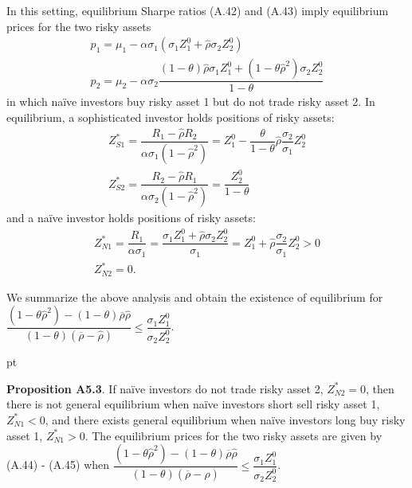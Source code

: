 \documentclass[10pt]{article}
\begin{document}
In this setting, equilibrium Sharpe ratios (A.42) and (A.43) imply equilibrium prices for the two risky assets
\begin{eqnarray}
& p_1 = \mu_1 - \alpha \sigma_1 (\sigma_1 Z_1^0 + {\hat \rho} \sigma_2 Z_2^0) & \\
& p_2 = \mu_2 - \alpha \sigma_2 \dfrac{(1 - \theta) {\hat \rho} \sigma_1 Z_1^0 + (1 - \theta {\hat \rho}^2) \sigma_2 Z_2^0}{1 - \theta} &
\end{eqnarray}
in which na\"ive investors buy risky asset 1 but do not trade risky asset 2. In equilibrium, a sophisticated investor holds positions of risky assets:
\begin{eqnarray}
& Z_{S 1}^* = \dfrac{R_1 - \hat \rho R_2}{\alpha \sigma_1 (1 - \hat \rho^2)} = Z_1^0 - \dfrac{\theta}{1 - \theta} {\hat \rho} \dfrac{\sigma_2}{\sigma_1} Z_2^0 & \\
& Z_{S 2}^* = \dfrac{R_2 - \hat \rho R_1}{\alpha \sigma_2 (1 - \hat \rho^2)} = \dfrac{Z_2^0}{1 - \theta} &
\end{eqnarray}
and a na\"ive investor holds positions of risky assets:
\begin{eqnarray}
& Z_{N 1}^* = \dfrac{R_1}{\alpha \sigma_1} = \dfrac{\sigma_1 Z_1^0 + {\hat \rho} \sigma_2 Z_2^0}{\sigma_1} = Z_1^0 + {\hat \rho} \dfrac{\sigma_2}{\sigma_1} Z_2^0 > 0 & \\
& Z_{N 2}^* = 0. &
\end{eqnarray}

We summarize the above analysis and obtain the existence of equilibrium for $ \dfrac{(1 - \theta {\hat \rho}^2) - (1 - \theta) \overline{\rho} {\hat \rho}}{(1 - \theta) (\overline{\rho} - {\hat \rho})} \leqslant \dfrac{\sigma_1 Z_1^0}{\sigma_2 Z_2^0} $.

 pt

{\bf Proposition A5.3}. If na\"ive investors do not trade risky asset 2, $ Z_{N 2}^* = 0 $, then there is not general equilibrium when na\"ive investors short sell risky asset 1, $ Z_{N 1}^* < 0 $, and there exists general equilibrium when na\"ive investors long buy risky asset 1, $ Z_{N 1}^* > 0 $. The equilibrium prices for the two risky assets are given by (A.44) - (A.45) when $ \dfrac{(1 - \theta {\hat \rho}^2) - (1 - \theta) \overline{\rho} {\hat \rho}}{(1 - \theta) (\overline{\rho} - {\hat \rho})} \leqslant \dfrac{\sigma_1 Z_1^0}{\sigma_2 Z_2^0} $.
\end{document}
